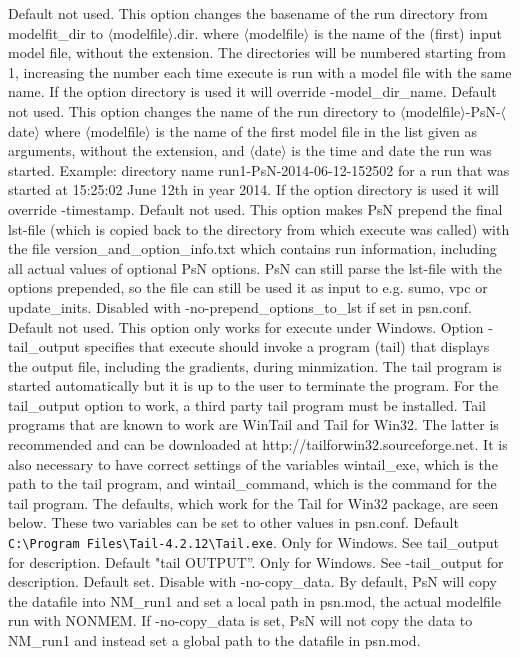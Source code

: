 \begin{optionlist}
Default not used. This option changes the basename of the run directory from modelfit\_dir to $\langle$modelfile$\rangle$.dir. where $\langle$modelfile$\rangle$ 
is the name of the (first) input model file, without the extension. 
The directories will be numbered starting from 1, increasing the number each time execute is run with a model file with the 
same name. If the option directory is used it will override -model\_dir\_name.
\nextopt
{}
Default not used. This option changes the name of the run directory to $\langle$modelfile$\rangle$-PsN-$\langle$date$\rangle$
where $\langle$modelfile$\rangle$ is the name of the first model file in the list given as arguments, without the extension,
and $\langle$date$\rangle$ is the time and date the run was started. 
Example: directory name run1-PsN-2014-06-12-152502 for a run that was started at 15:25:02 June 12th in year 2014.
If the option directory is used it will override -timestamp.
\nextopt
{}
Default not used. This option makes PsN prepend the final lst-file (which is copied back to the directory from which execute was called) with the file version\_and\_option\_info.txt which contains run information, including     all actual values of optional PsN options. PsN can still parse the lst-file with the options prepended, so the file can still be used it as input to e.g. sumo, vpc or update\_inits. Disabled with -no-prepend\_options\_to\_lst if set in psn.conf.
\nextopt
{}
Default not used. This option only works for execute under Windows. Option -tail\_output specifies that execute should invoke a program (tail) that displays the output file, including the gradients, during minmization. The tail program is started automatically but it is up to the user to terminate the program. For the tail\_output option to work, a third party tail program must be installed. Tail programs that are known to work are WinTail and Tail for Win32.  The latter is recommended and can be downloaded at http://tailforwin32.sourceforge.net. It is also necessary to have correct settings of the variables wintail\_exe, which is the path to the tail program, and wintail\_command, which is the command for the tail program. The defaults, which work for the Tail for Win32 package, are seen below. These two variables can be set to other values in psn.conf.
\nextopt
{}
Default \verb|C:\Program Files\Tail-4.2.12\Tail.exe|. Only for Windows. See tail\_output for description.
\nextopt
{}
Default "tail OUTPUT”. Only for Windows. See -tail\_output for description.
\nextopt
{}
Default set. Disable with -no-copy\_data. By default, PsN will copy the datafile into NM\_run1 and set a local path in psn.mod, the actual modelfile run with NONMEM. If -no-copy\_data is set, PsN will not copy the data to NM\_run1 and instead set a global path to the datafile in psn.mod.
\nextopt
\end{optionlist}

